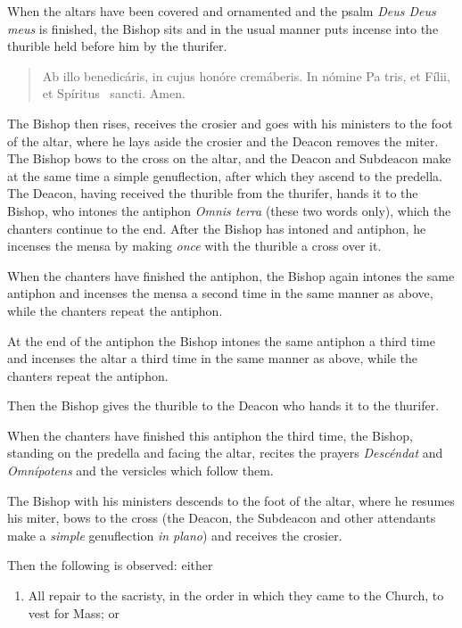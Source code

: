 \documentclass[letterpaper]{report}
\newcommand\blessincense{
\begin{quote}
   Ab illo benedicáris, in cujus honóre cremáberis. In nómine Pa\cross
    tris, et Fí\cross lii, et Spíritus \cross\ sancti. \rbar Amen.
\end{quote}
}
\begin{document}
{    \rubric When the altars have been covered and ornamented and the psalm
    \textit{Deus Deus meus} is finished, the Bishop sits and in the usual manner
    puts incense into the thurible held before him by the thurifer.

    \blessincense

    The Bishop then rises, receives the crosier and goes with his ministers to the
    foot of the altar, where he lays aside the crosier and the Deacon removes the
    miter. The Bishop bows to the cross on the altar, and the Deacon and Subdeacon
    make at the same time a simple genuflection, after which they ascend to the
    predella. The Deacon, having received the thurible from the thurifer, hands it
    to the Bishop, who intones the antiphon \textit{Omnis terra} (these two words
    only), which the chanters continue to the end. After the Bishop has intoned and
    antiphon, he incenses the mensa by making \textit{once} with the thurible a
    cross over it.

    \rubric When the chanters have finished the antiphon, the Bishop again intones
    the same antiphon and incenses the mensa a second time in the same manner as
    above, while the chanters repeat the antiphon.

    \rubric At the end of the antiphon the Bishop intones the same antiphon a third
    time and incenses the altar a third time in the same manner as above, while the
    chanters repeat the antiphon.

    Then the Bishop gives the thurible to the Deacon who hands it to the thurifer.

    \rubric When the chanters have finished this antiphon the third time, the
    Bishop, standing on the predella and facing the altar, recites the prayers
    \textit{Descéndat} and \textit{Omnípotens} and the versicles which follow them.

    \rubric The Bishop with his ministers descends to the foot of the altar, where
    he resumes his miter, bows to the cross (the Deacon, the Subdeacon and other
    attendants make a \textit{simple} genuflection \textit{in plano}) and receives
    the crosier.

    Then the following is observed: either

    \begin{enumerate}

        \item All repair to the sacristy, in the order in which they came to the
            Church, to vest for Mass; or


\end{enumerate}}
\end{document}
